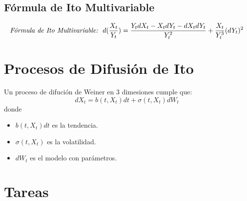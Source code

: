 \documentclass[11pt,fleqn]{book} %
\numberwithin{equation}{section} %
\numberwithin{figure}{section} %
\numberwithin{table}{section} %
\begin{document}
\subsection{Fórmula de Ito Multivariable}

\begin{align} 
\begin{split}
\textit{Fórmula de Ito Multivariable:\:\:\:} d(\frac{X_{t}}{Y_{t}})=\frac{Y_{t}dX_{t} - X_{t}dY_{t} - dX_{t}dY_{t}}{Y_{t}^{2}} + \frac{X_{t}}{Y_{t}^{3}}(dY_{t})^{2}
\end{split}					
\end{align}
\section{Procesos de Difusión de Ito}
Un proceso de difución de Weiner en 3 dimesiones cumple que:
$$ dX_{t} = b(t,X_{t})dt + \sigma (t,X_{t})dW_{t}   $$
donde
\begin{itemize}
    \item $b(t,X_{t})dt$ es la tendencia.
    \item $\sigma (t,X_{t})$ es la volatilidad.
    \item $dW_{t}$ es el modelo con parámetros.
\end{itemize}
\newpage
\section{Tareas}
\end{document}

